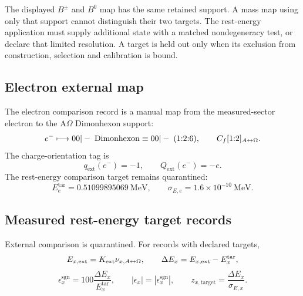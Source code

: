 The displayed \(B^\pm\) and \(B^0\) map has the same retained support.
A mass map using only that support cannot distinguish their two targets.
The rest-energy application must supply additional state with a matched
nondegeneracy test, or declare that limited resolution. A target is held out
only when its exclusion from construction, selection and calibration is bound.


\subsection{Electron external map}\label{manual:rest:electron-external-map}
The electron comparison record is a manual map from the measured-sector electron to the A\(\Omega\) Dimonhexon support:
\[
e^-
\longmapsto
00|-\;\mathrm{Dimonhexon}
\equiv
00|-\;(1{:}2{:}6),
\qquad
C_f[1{:}2]_{A{\leftrightarrow}\Omega}.
\]
The charge-orientation tag is
\[
q_{\mathrm{ext}}(e^-)=-1,
\qquad
Q_{\mathrm{ext}}(e^-)=-e.
\]
The rest-energy comparison target remains quarantined:
\[
E^{\mathrm{tar}}_e=0.51099895069\ \mathrm{MeV},
\qquad
\sigma_{E,e}=1.6\times10^{-10}\ \mathrm{MeV}.
\]



\subsection{Measured rest-energy target records}\label{manual:rest:measured-comparison-analysis}
External comparison is quarantined. For records with declared targets,
\[
E_{x,\mathrm{ext}}=K_{\mathrm{ext}}\nu_{x,A{\leftrightarrow}\Omega},
\qquad
\Delta E_x=E_{x,\mathrm{ext}}-E_x^{\mathrm{tar}},
\]
\[
\epsilon_x^{\mathrm{sgn}}
=
100\frac{\Delta E_x}{E_x^{\mathrm{tar}}},
\qquad
|\epsilon_x|=|\epsilon_x^{\mathrm{sgn}}|,
\qquad
z_{x,\mathrm{target}}=\frac{\Delta E_x}{\sigma_{E,x}}.
\]


